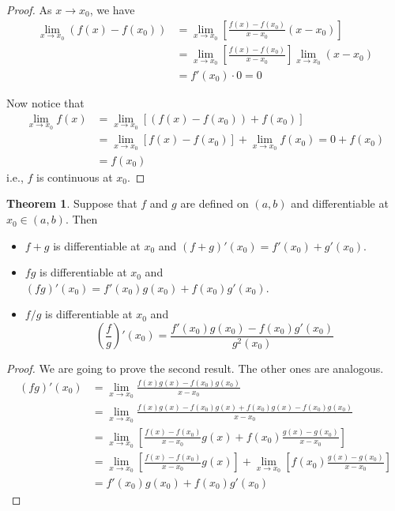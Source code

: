\documentclass[tikz,12pt,a4paper]{article}
\theoremstyle{definition}
\newtheorem{theorem}{Theorem}[section]
\begin{document}
\begin{proof}
	As $x \to x_0$, we have
	\begin{equation*}
		\begin{aligned}
			\lim_{x \to x_0} (f(x) - f(x_0)) &= \lim_{x \to x_0} \left[ \frac{f(x) - f(x_0)}{x - x_0} (x - x_0) \right] \\
			&= \lim_{x \to x_0} \left[ \frac{f(x) - f(x_0)}{x - x_0} \right] \lim_{x \to x_0} (x - x_0) \\
			&= f'(x_0) \cdot 0 = 0
		\end{aligned}
	\end{equation*}

	Now notice that
	\begin{equation*}
	\begin{aligned}
			\lim_{x \to x_0} f(x) &= \lim_{x \to x_0} [(f(x) - f(x_0)) + f(x_0)] \\
			&= \lim_{x \to x_0} [f(x) - f(x_0)] + \lim_{x \to x_0} f(x_0) = 0 + f(x_0) \\
			&= f(x_0)
		\end{aligned}
	\end{equation*}
	i.e., $f$ is continuous at $x_0$.
\end{proof}

\begin{theorem}
	Suppose that $f$ and $g$ are defined on $(a,b)$ and differentiable at $x_0 \in (a,b)$. Then
	\begin{itemize}
		\item $f+g$ is differentiable at $x_0$ and $(f+g)'(x_0) = f'(x_0)+g'(x_0)$.
		\item $fg$ is differentiable at $x_0$ and $(fg)'(x_0) = f'(x_0)g(x_0) + f(x_0)g'(x_0)$.
		\item $f/g$ is differentiable at $x_0$ and
		\[
			\left( \frac{f}{g} \right)'(x_0) = \frac{f'(x_0)g(x_0) - f(x_0)g'(x_0)}{g^2(x_0)}
		\]
	\end{itemize}
\end{theorem}

\begin{proof}
	We are going to prove the second result. The other ones are analogous.
	\begin{equation*}
		\begin{aligned}
			(fg)'(x_0) &= \lim_{x \to x_0} \frac{f(x)g(x) - f(x_0)g(x_0)}{x-x_0} \\
			&= \lim_{x \to x_0} \frac{f(x)g(x) - f(x_0)g(x) + f(x_0)g(x) - f(x_0)g(x_0)}{x-x_0} \\
			&= \lim_{x \to x_0} \left[ \frac{f(x) - f(x_0)}{x-x_0} g(x) + f(x_0) \frac{g(x) - g(x_0)}{x-x_0}  \right] \\
			&= \lim_{x \to x_0} \left[ \frac{f(x) - f(x_0)}{x-x_0} g(x) \right] + \lim_{x \to x_0} \left[ f(x_0) \frac{g(x) - g(x_0)}{x-x_0}  \right] \\
			&= f'(x_0) g(x_0) + f(x_0)g'(x_0)
		\end{aligned}
	\end{equation*}
\end{proof}
\end{document}
